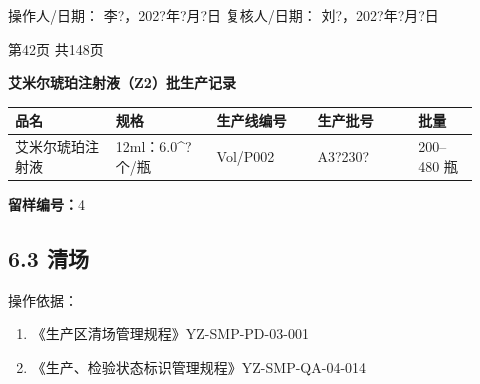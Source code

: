 \documentclass[UTF8,10pt,a4paper,fontset=fandol]{ctexart}
\newcommand{\fieldvalue}[1]{#1}
\newcommand{\handwritten}[1]{#1}
\begin{document}
\vspace{8pt}

\noindent
操作人/日期：
\fieldvalue{\handwritten{李?，202?年?月?日}}
\hfill
复核人/日期：
\fieldvalue{\handwritten{刘?，202?年?月?日}}

\begin{center}
第42页 共148页
\end{center}

\newpage

\begin{center}
\textbf{艾米尔琥珀注射液（Z2）批生产记录}
\end{center}

\begin{tabular}{|p{0.20\linewidth}|p{0.20\linewidth}|p{0.20\linewidth}|p{0.20\linewidth}|p{0.12\linewidth}|}
\hline
品名 & 规格 & 生产线编号 & 生产批号 & 批量 \\
\hline
\fieldvalue{艾米尔琥珀注射液}
&
\fieldvalue{12ml：6.0\times10^{?}个/瓶}
&
\fieldvalue{\handwritten{Vol/P002}}
&
\fieldvalue{\handwritten{A3?230?}}
&
\fieldvalue{200--480 瓶}
\\
\hline
\end{tabular}

\vspace{0.5em}

\textbf{留样编号：}\fieldvalue{4}

\subsection*{6.3 清场}

操作依据：

\begin{enumerate}
    \item 《生产区清场管理规程》\hfill YZ-SMP-PD-03-001
    \item 《生产、检验状态标识管理规程》\hfill YZ-SMP-QA-04-014
\end{enumerate}
\end{document}
